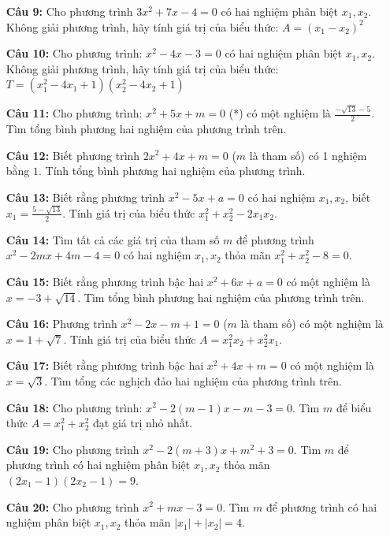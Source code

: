 \documentclass[12pt,a4paper]{extarticle}
\begin{document}
\begin{enumerate}
    \item[\textbf{Câu 9:}] Cho phương trình $3x^2 + 7x - 4 = 0$ có hai nghiệm phân biệt $x_1, x_2$. Không giải phương trình, hãy tính giá trị của biểu thức: $A = (x_1 - x_2)^2$
    
    \item[\textbf{Câu 10:}] Cho phương trình: $x^2 - 4x - 3 = 0$ có hai nghiệm phân biệt $x_1, x_2$. Không giải phương trình, hãy tính giá trị của biểu thức: $T = (x_1^2 - 4x_1 + 1)(x_2^2 - 4x_2 + 1)$

     \item[\textbf{Câu 11:}] Cho phương trình: $x^2 + 5x + m = 0$ (*) có một nghiệm là $\frac{-\sqrt{13}-5}{2}$. Tìm tổng bình phương hai nghiệm của phương trình trên.
    
    \item[\textbf{Câu 12:}] Biết phương trình $2x^2 + 4x + m = 0$ ($m$ là tham số) có 1 nghiệm bằng $1$. Tính tổng bình phương hai nghiệm của phương trình.
    
    \item[\textbf{Câu 13:}] Biết rằng phương trình $x^2 - 5x + a = 0$ có hai nghiệm $x_1, x_2$, biết $x_1 = \frac{5 - \sqrt{13}}{2}$. Tính giá trị của biểu thức $x_1^2 + x_2^2 - 2x_1x_2$.
    
    \item[\textbf{Câu 14:}] Tìm tất cả các giá trị của tham số $m$ để phương trình $x^2 - 2mx + 4m - 4 = 0$ có hai nghiệm $x_1, x_2$ thỏa mãn $x_1^2 + x_2^2 - 8 = 0$.
    
    \item[\textbf{Câu 15:}] Biết rằng phương trình bậc hai $x^2 + 6x + a = 0$ có một nghiệm là $x = -3 + \sqrt{14}$. Tìm tổng bình phương hai nghiệm của phương trình trên.
    
    \item[\textbf{Câu 16:}] Phương trình $x^2 - 2x - m + 1 = 0$ ($m$ là tham số) có một nghiệm là $x = 1 + \sqrt{7}$. Tính giá trị của biểu thức $A = x_1^2x_2 + x_2^2x_1$.
    
    \item[\textbf{Câu 17:}] Biết rằng phương trình bậc hai $x^2 + 4x + m = 0$ có một nghiệm là $x = \sqrt{3}$. Tìm tổng các nghịch đảo hai nghiệm của phương trình trên.
    
    \item[\textbf{Câu 18:}] Cho phương trình: $x^2 - 2(m-1)x - m - 3 = 0$. Tìm $m$ để biểu thức $A = x_1^2 + x_2^2$ đạt giá trị nhỏ nhất.
    
    \item[\textbf{Câu 19:}] Cho phương trình $x^2 - 2(m+3)x + m^2 + 3 = 0$. Tìm $m$ để phương trình có hai nghiệm phân biệt $x_1, x_2$ thỏa mãn $(2x_1 - 1)(2x_2 - 1) = 9$.

    \item[\textbf{Câu 20:}] Cho phương trình $x^2 + mx - 3 = 0$. Tìm $m$ để phương trình có hai nghiệm phân biệt $x_1, x_2$ thỏa mãn $|x_1| + |x_2| = 4$.
\end{enumerate}
\end{document}
